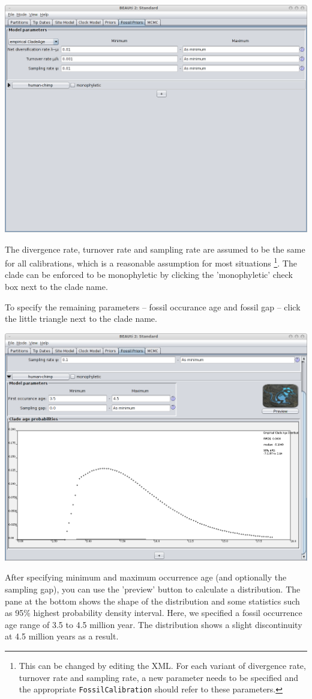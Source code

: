 \documentclass{article}
\begin{document}
\begin{center}\includegraphics[width=\textwidth,clip=true,trim=0 300 0 0]{fossilPriorsTab2.png}\end{center}
The divergence rate, turnover rate and sampling rate are assumed to be the same
for all calibrations, which is a reasonable assumption for most situations
\footnote{This can be changed by editing the XML. For each variant of divergence
	rate, turnover rate and sampling rate, a new parameter needs to be specified
	and the appropriate {\tt FossilCalibration} should refer to these parameters.}.
The clade can be enforced to be monophyletic by clicking the 'monophyletic' check box
next to the clade name.

To specify the remaining parameters -- fossil occurance age and fossil gap -- click the 
little triangle next to the clade name.
\begin{center}\includegraphics[width=\textwidth,clip=true]{preview.png}\end{center}
After specifying minimum and maximum occurrence age (and optionally the sampling gap),
you can use the 'preview' button to calculate a distribution. The pane at the bottom
shows the shape of the distribution and some statistics such as 95\% highest probability
density interval. Here, we specified a fossil occurrence age range of 3.5 to 4.5 million
year. The distribution shows a slight discontinuity at 4.5 million years as a result.
\end{document}
